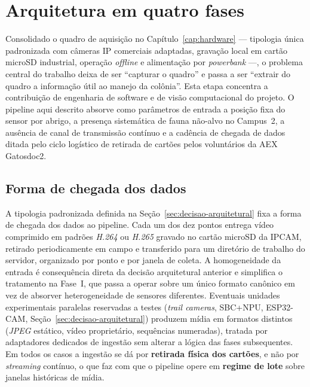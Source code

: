 \section{Arquitetura em quatro fases}
\label{sec:pipeline-visao-geral}

Consolidado o quadro de aquisição no Capítulo~\ref{cap:hardware} --- tipologia única padronizada com câmeras IP comerciais adaptadas, gravação local em cartão microSD industrial, operação \emph{offline} e alimentação por \emph{powerbank} ---, o problema central do trabalho deixa de ser ``capturar o quadro'' e passa a ser ``extrair do quadro a informação útil ao manejo da colônia''. Esta etapa concentra a contribuição de engenharia de software e de visão computacional do projeto. O pipeline aqui descrito absorve como parâmetros de entrada a posição fixa do sensor por abrigo, a presença sistemática de fauna não-alvo no Campus~2, a ausência de canal de transmissão contínuo e a cadência de chegada de dados ditada pelo ciclo logístico de retirada de cartões pelos voluntários da AEX Gatosdoc2.

\subsection*{Forma de chegada dos dados}

A tipologia padronizada definida na Seção~\ref{sec:decisao-arquitetural} fixa a forma de chegada dos dados ao pipeline. Cada um dos dez pontos entrega vídeo comprimido em padrões \emph{H.264} ou \emph{H.265} gravado no cartão microSD da IPCAM, retirado periodicamente em campo e transferido para um diretório de trabalho do servidor, organizado por ponto e por janela de coleta. A homogeneidade da entrada é consequência direta da decisão arquitetural anterior e simplifica o tratamento na Fase~I, que passa a operar sobre um único formato canônico em vez de absorver heterogeneidade de sensores diferentes. Eventuais unidades experimentais paralelas reservadas a testes (\emph{trail cameras}, SBC+NPU, ESP32-CAM, Seção~\ref{sec:decisao-arquitetural}) produzem mídia em formatos distintos (\emph{JPEG} estático, vídeo proprietário, sequências numeradas), tratada por adaptadores dedicados de ingestão sem alterar a lógica das fases subsequentes. Em todos os casos a ingestão se dá por \textbf{retirada física dos cartões}, e não por \emph{streaming} contínuo, o que faz com que o pipeline opere em \textbf{regime de lote} sobre janelas históricas de mídia.

